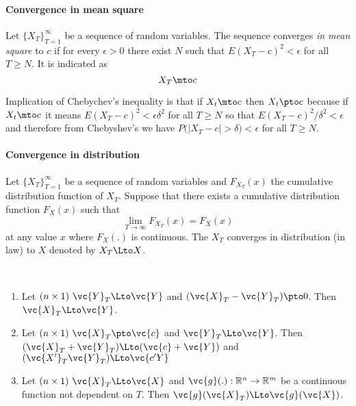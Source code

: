 \paragraph{Convergence in mean square}
Let $\{X_T\}_{T=1}^{\infty}$ be a sequence of random variables. The sequence converges \emph{in mean square} to $c$ if for every $\epsilon > 0$ there exist $N$ such that $E(X_T -c)^2 <\epsilon$ for all $T \ge N$. It is indicated as
\begin{equation*}
X_T \mto c
\end{equation*}

Implication of Chebychev's inequality is that if $X_t \mto c$ then $X_t \pto c$ because if $X_t \mto c$ it means $E(X_T -c)^2 <\epsilon \delta^2$ for all $T \ge N$ so that $E(X_T -c)^2/ \delta^2 <\epsilon$ and therefore from Chebyshev's we have $P\big(|X_T -c| > \delta \big) <\epsilon$ for all $T \ge N$.



\paragraph{Convergence in distribution}
Let $\{X_T\}_{T=1}^{\infty}$ be a sequence of random variables and $F_{X_T}(x)$ the cumulative distribution function of $X_T$. Suppose that there exists a cumulative distribution function $F_X(x)$ such that 
\begin{equation}
\lim_{T \to \infty} F_{X_T}(x) = F_X(x)
\end{equation}
at any value $x$ where $F_X(.)$ is continuous. The $X_T$ converges in distribution (in law) to $X$ denoted by $X_T \Lto X$.

\begin{proposition} \ 
\begin{enumerate}
\item Let $(n \times 1) \ \vc{Y}_T \Lto \vc{Y}$ and $(\vc{X}_T - \vc{Y}_T) \pto 0$. Then $\vc{X}_T \Lto \vc{Y}$.
\item Let $(n \times 1) \ \vc{X}_T \pto \vc{c}$ and $\vc{Y}_T \Lto \vc{Y}$. Then $(\vc{X}_T+\vc{Y}_T) \Lto (\vc{c}+\vc{Y})$ and  $(\vc{X'}_T \vc{Y}_T) \Lto \vc{c'Y}$
\item Let $(n \times 1) \ \vc{X}_T \Lto \vc{X}$ and $\vc{g}(.): \mathbb{R}^n \to \mathbb{R}^m$ be a continuous function not dependent on $T$. Then $\vc{g}(\vc{X}_T) \Lto \vc{g}(\vc{X})$.
\end{enumerate}
\end{proposition}

